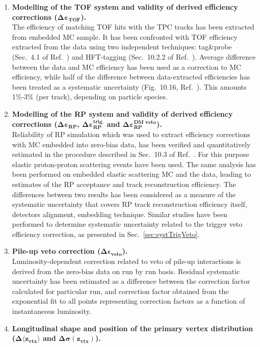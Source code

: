 \begin{enumerate}
 \item \textbf{Modelling of the TOF system and validity of derived efficiency corrections ($\bm{\Delta\varepsilon_{\text{TOF}}}$).}\\
 The efficiency of matching TOF hits with the TPC tracks has been extracted from embedded MC sample. It has been confronted with TOF efficiency extracted from the data using two independent techniques: tag\&probe (Sec.~4.1 of Ref.~\cite{supplementaryNote}) and HFT-tagging (Sec.~10.2.2 of Ref.~\cite{supplementaryNote}). Average difference between the data and MC efficiency has been used as a correction to MC efficiency, while half of the difference between data-extracted efficiencies has been treated as a systematic uncertainty (Fig.~10.16, Ref.~\cite{supplementaryNote}). This amounts 1\%-3\% (per track), depending on particle species.
%
 \item \textbf{Modelling of the RP system and validity of derived efficiency corrections ($\bm{\Delta\varepsilon_{\text{RP}}}$, $\bm{\Delta\varepsilon_{\text{RP}}^{\text{trig.}}}$ and $\bm{\Delta\varepsilon_{\text{RP}}^{\text{DM veto}}}$).}\\
 Reliability of RP simulation which was used to extract efficiency corrections with MC embedded into zero-bias data, has been verified and quantitatively estimated in the procedure described in Sec.~10.3 of Ref.~\cite{supplementaryNote}. For this purpose elastic proton-proton scattering events have been used. The same analysis has been performed on embedded elastic scattering MC and the data, leading to estimates of the RP acceptance and track reconstruction efficiency. The differences between two results has been considered as a measure of the systematic uncertainty that covers RP track reconstruction efficiency itself, detectors alignment, embedding technique. Similar studies have been performed to determine systematic uncertainty related to the trigger veto efficiency correction, as presented in Sec.~\ref{sec:systTrigVeto}.
 \item \textbf{Pile-up veto correction ($\bm{\Delta\epsilon_{\text{veto}}}$).}\\
 Luminosity-dependent correction related to veto of pile-up interactions is derived from the zero-bias data on run by run basis. Residual systematic uncertainty has been estimated as a difference between the correction factor calculated for particular run, and correction factor obtained from the exponential fit to all points representing correction factors as a function of instantaneous luminosity.
 \item \textbf{Longitudinal shape and position of the primary vertex distribution ($\bm{\Delta\langle z_{\text{vtx}}\rangle}$ and $\bm{\Delta\sigma( z_{\text{vtx}})}$).}\\

\end{enumerate}
